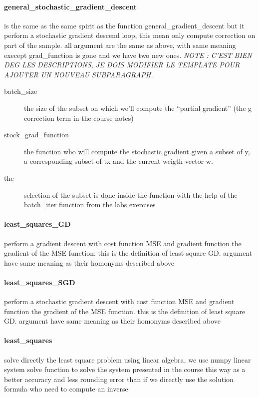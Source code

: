 \documentclass[10pt,conference,compsocconf]{IEEEtran}
\begin{document}
\paragraph{general\_stochastic\_gradient\_descent}
is the same as the same spirit as the function general\_gradient\_descent
but it perform a stochastic gradient descend loop, this mean only compute correction on part of the sample. all argument are the same as above, with same meaning execept grad\_function is gone and we have two new ones.
\emph{NOTE : C'EST BIEN DEG LES DESCRIPTIONS, JE DOIS MODIFIER LE TEMPLATE POUR AJOUTER UN NOUVEAU SUBPARAGRAPH.}
\begin{description}
\item [{batch\_size}] the size of the subset on which we'll compute the
``partial gradient'' (the g correction term in the course notes)
\item [{stock\_grad\_function}] the function who will compute the stochastic
gradient given a subset of y, a corresponding subset of tx and the
current weigth vector w.
\item [{the}] selection of the subset is done inside the function with
the help of the batch\_iter function from the labs exercises
\end{description}


\paragraph{least\_squares\_GD}
perform a gradient descent with cost function MSE and gradient function the gradient of the MSE function. this is the definition of least square GD. argument have same meaning as their homonyms described above

\paragraph{least\_squares\_SGD}
perform a stochastic gradient descent with cost function MSE and gradient function the gradient of the MSE function. this is the definition of least square GD. argument have same meaning as their homonyms described above

\paragraph{least\_squares}
solve directly the least square problem using linear algebra, we use numpy linear system solve function to solve the system presented in the course this way as a better accuracy and less rounding error than if we directly use the solution formula who need to compute an inverse
\end{document}
